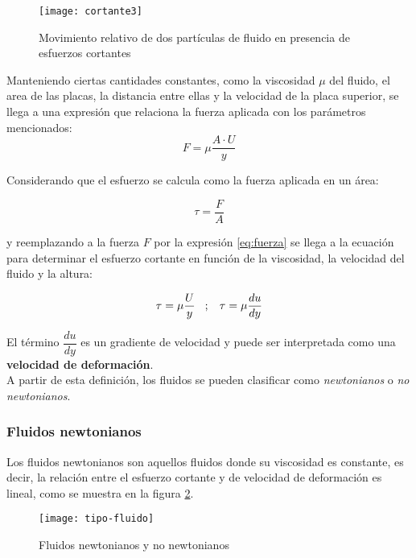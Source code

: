 \begin{figure}[H]
	\centering
	\texttt{[image: cortante3]}
	\caption{Movimiento relativo de dos partículas de fluido en presencia de esfuerzos cortantes}
	\label{fig:fluido-placas-paralelas}
 \end{figure}

Manteniendo ciertas cantidades constantes, como la viscosidad $\mu$ del fluido, el area de las placas, la distancia entre ellas y la velocidad de la placa superior, se llega a una expresión que relaciona la fuerza aplicada con los parámetros mencionados:
\begin{equation}
	F = \mu \dfrac{A \cdot U}{y}
	\label{eq:fuerza}
\end{equation}

Considerando que el esfuerzo se calcula como la fuerza aplicada en un área:

\begin{equation*}
	\tau = \dfrac{F}{A}
	\label{eq:esfuerzo}
\end{equation*}

y reemplazando a la fuerza $F$ por la expresión \ref{eq:fuerza} se llega a la ecuación para determinar el esfuerzo cortante en función de la viscosidad, la velocidad del fluido y la altura:

\begin{equation}
	\tau = \mu \dfrac{U}{y} \hspace{.3cm};\hspace{.3cm} \tau = \mu \dfrac{du}{dy}
\end{equation}

El término $\dfrac{du}{dy}$ es un gradiente de velocidad y puede ser interpretada como una \textbf{velocidad de deformación}.\\ 


A partir de esta definición, los fluidos se pueden clasificar como \textit{newtonianos} o \textit{no newtonianos}.

\subsubsection{Fluidos newtonianos}

Los fluidos newtonianos son aquellos fluidos donde su viscosidad es constante, es decir, la relación entre el esfuerzo cortante y de velocidad de deformación es lineal, como se muestra en la figura \ref{diag:fluido-newtoniano}.



\begin{figure}[H]
	\centering
	\texttt{[image: tipo-fluido]}
	\caption{Fluidos newtonianos y no newtonianos}
	\label{diag:fluido-newtoniano}
\end{figure}

